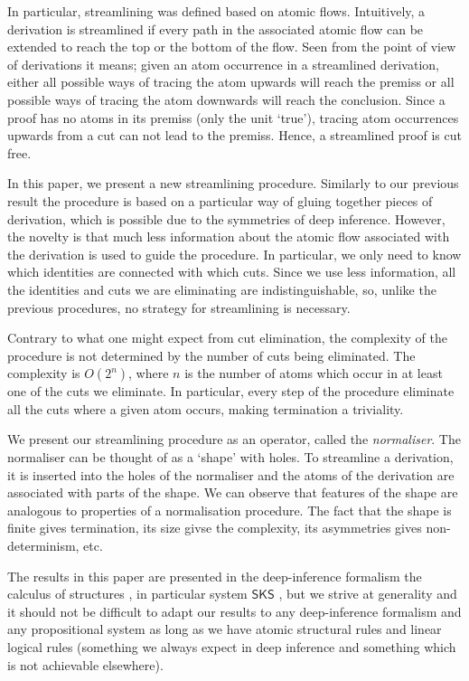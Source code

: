 \documentclass[a4paper]{amsart}
\theoremstyle{definition}
\theoremstyle{remark}
\begin{document}
In particular, streamlining was defined based on atomic flows. Intuitively, a derivation is streamlined if every path in the associated atomic flow can be extended to reach the top or the bottom of the flow. Seen from the point of view of derivations it means; given an atom occurrence in a streamlined derivation, either all possible ways of tracing the atom upwards will reach the premiss or all possible ways of tracing the atom downwards will reach the conclusion. Since a proof has no atoms in its premiss (only the unit `true'), tracing atom occurrences upwards from a cut can not lead to the premiss. Hence, a streamlined proof is cut free.

In this paper, we present a new streamlining procedure. Similarly to our previous result the procedure is based on a particular way of gluing together pieces of derivation, which is possible due to the symmetries of deep inference. However, the novelty is that much less information about the atomic flow associated with the derivation is used to guide the procedure. In particular, we only need to know which identities are connected with which cuts. Since we use less information, all the identities and cuts we are eliminating are indistinguishable, so, unlike the previous procedures, no strategy for streamlining is necessary.

Contrary to what one might expect from cut elimination, the complexity of the procedure is not determined by the number of cuts being eliminated. The complexity is $O(2^n)$, where $n$ is the number of atoms which occur in at least one of the cuts we eliminate. In particular, every step of the procedure eliminate all the cuts where a given atom occurs, making termination a triviality.

We present our streamlining procedure as an operator, called the \emph{normaliser}. The normaliser can be thought of as a `shape' with holes. To streamline a derivation, it is inserted into the holes of the normaliser and the atoms of the derivation are associated with parts of the shape. We can observe that features of the shape are analogous to properties of a normalisation procedure. The fact that the shape is finite gives termination, its size givse the complexity, its asymmetries gives non-determinism, etc.

\newcommand{\SKS}{\mathsf{SKS}}
The results in this paper are presented in the deep-inference formalism the calculus of structures \cite{Gugl:06:A-System:kl}, in particular system $\SKS$ \cite{BrunTiu:01:A-Local-:mz,Brun:04:Deep-Inf:rq}, but we strive at generality and it should not be difficult to adapt our results to any deep-inference formalism and any propositional system as long as we have atomic structural rules and linear logical rules (something we always expect in deep inference and something which is not achievable elsewhere).
\end{document}
